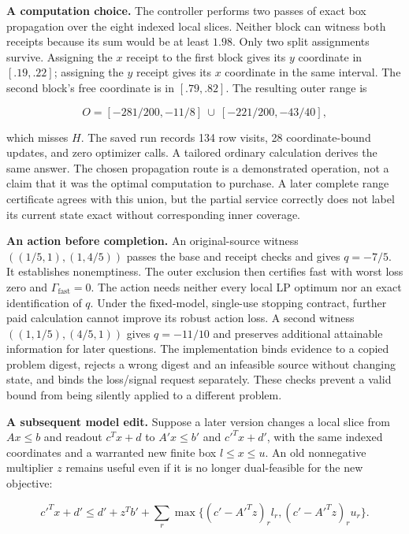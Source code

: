 \documentclass{article}
\theoremstyle{definition}
\begin{document}
\textbf{A computation choice.} The controller performs two passes of
exact box propagation over the eight indexed local slices. Neither block
can witness both receipts because its sum would be at least \(1.98\).
Only two split assignments survive. Assigning the \(x\) receipt to the
first block gives its \(y\) coordinate in \([.19,.22]\); assigning the
\(y\) receipt gives its \(x\) coordinate in the same interval. The
second block's free coordinate is in \([.79,.82]\). The resulting outer
range is

\begin{equation}
O=[-281/200,-11/8]\ \cup\ [-221/200,-43/40],
 \label{eq-episode-range}
\end{equation}

which misses \(H\). The saved run records 134 row visits, 28
coordinate-bound updates, and zero optimizer calls. A tailored ordinary
calculation derives the same answer. The chosen propagation route is a
demonstrated operation, not a claim that it was the optimal computation
to purchase. A later complete range certificate agrees with this union,
but the partial service correctly does not label its current state exact
without corresponding inner coverage.

\textbf{An action before completion.} An original-source witness
\(((1/5,1),(1,4/5))\) passes the base and receipt checks and gives
\(q=-7/5\). It establishes nonemptiness. The outer exclusion then
certifies fast with worst loss zero and \(\Gamma_{\mathrm{fast}}=0\).
The action needs neither every local LP optimum nor an exact
identification of \(q\). Under the fixed-model, single-use stopping
contract, further paid calculation cannot improve its robust action
loss. A second witness \(((1,1/5),(4/5,1))\) gives \(q=-11/10\) and
preserves additional attainable information for later questions. The
implementation binds evidence to a copied problem digest, rejects a
wrong digest and an infeasible source without changing state, and binds
the loss/signal request separately. These checks prevent a valid bound
from being silently applied to a different problem.

\textbf{A subsequent model edit.} Suppose a later version changes a
local slice from \(Ax\leq b\) and readout \(c^Tx+d\) to \(A'x\leq b'\)
and \(c'^Tx+d'\), with the same indexed coordinates and a warranted new
finite box \(l\leq x\leq u\). An old nonnegative multiplier \(z\)
remains useful even if it is no longer dual-feasible for the new
objective:

\begin{equation}
c'^Tx+d'\leq d'+z^Tb'
       +\sum_r\max\{(c'-A'^Tz)_r l_r,(c'-A'^Tz)_r u_r\}.
 \label{eq-dual-reuse}
\end{equation}
\end{document}
